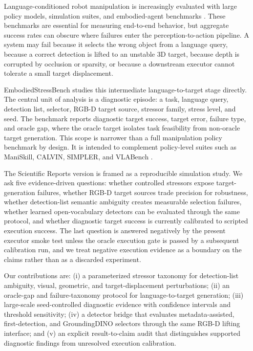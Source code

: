 Language-conditioned robot manipulation is increasingly evaluated with large policy models, simulation suites, and embodied-agent benchmarks \cite{shridhar2022cliport,jiang2023vima,brohan2023rt1,brohan2023rt2,openx2023}. These benchmarks are essential for measuring end-to-end behavior, but aggregate success rates can obscure where failures enter the perception-to-action pipeline. A system may fail because it selects the wrong object from a language query, because a correct detection is lifted to an unstable 3D target, because depth is corrupted by occlusion or sparsity, or because a downstream executor cannot tolerate a small target displacement.

EmbodiedStressBench studies this intermediate language-to-target stage directly. The central unit of analysis is a diagnostic episode: a task, language query, detection list, selector, RGB-D target source, stressor family, stress level, and seed. The benchmark reports diagnostic target success, target error, failure type, and oracle gap, where the oracle target isolates task feasibility from non-oracle target generation. This scope is narrower than a full manipulation policy benchmark by design. It is intended to complement policy-level suites such as ManiSkill, CALVIN, SIMPLER, and VLABench \cite{gu2021maniskill,gu2023maniskill2,mees2022calvin,li2024simpler,zhang2024vlabench}.

The Scientific Reports version is framed as a reproducible simulation study. We ask five evidence-driven questions: whether controlled stressors expose target-generation failures, whether RGB-D target sources trade precision for robustness, whether detection-list semantic ambiguity creates measurable selection failures, whether learned open-vocabulary detectors can be evaluated through the same protocol, and whether diagnostic target success is currently calibrated to scripted execution success. The last question is answered negatively by the present executor smoke test unless the oracle execution gate is passed by a subsequent calibration run, and we treat negative execution evidence as a boundary on the claims rather than as a discarded experiment.

Our contributions are: (i) a parameterized stressor taxonomy for detection-list ambiguity, visual, geometric, and target-displacement perturbations; (ii) an oracle-gap and failure-taxonomy protocol for language-to-target generation; (iii) large-scale seed-controlled diagnostic evidence with confidence intervals and threshold sensitivity; (iv) a detector bridge that evaluates metadata-assisted, first-detection, and GroundingDINO selectors through the same RGB-D lifting interface; and (v) an explicit result-to-claim audit that distinguishes supported diagnostic findings from unresolved execution calibration.
